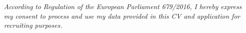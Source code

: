 \documentclass[10pt,A4]{article}
\newcommand{\mystrut}{\rule[-.3\baselineskip]{0pt}{\baselineskip}}
\begin{document}
{\begin{minipage}[c][0.95\textheight][t]{\linewidth}
\null
\vspace*{\fill}
\begin{center}
	\textit{\small According to Regulation of the European Parliament
		679/2016, I hereby express my consent to process and use my data provided in
		this CV and application for recruiting purposes.}
\end{center}


\hspace{-0.25\linewidth}\colorbox{bgcol}{\makebox[1.5\linewidth][c]{\mystrut \small \textcolor{white}{Francesco Ioli - \today}}}\\[-6pt]


\end{minipage}}

%
%
%
%
%
%
\end{document}
